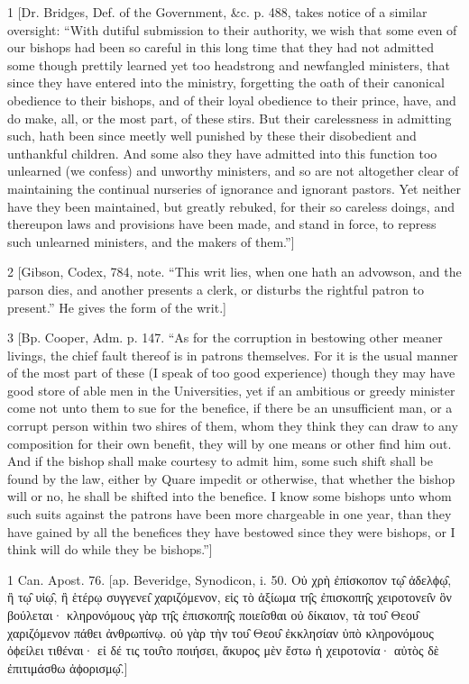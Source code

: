 1
[Dr. Bridges, Def. of the Government, &c. p. 488, takes notice of a similar oversight: “With dutiful submission to their authority, we wish that some even of our bishops had been so careful in this long time that they had not admitted some though prettily learned yet too headstrong and newfangled ministers, that since they have entered into the ministry, forgetting the oath of their canonical obedience to their bishops, and of their loyal obedience to their prince, have, and do make, all, or the most part, of these stirs. But their carelessness in admitting such, hath been since meetly well punished by these their disobedient and unthankful children. And some also they have admitted into this function too unlearned (we confess) and unworthy ministers, and so are not altogether clear of maintaining the continual nurseries of ignorance and ignorant pastors. Yet neither have they been maintained, but greatly rebuked, for their so careless doings, and thereupon laws and provisions have been made, and stand in force, to repress such unlearned ministers, and the makers of them.”]

2
[Gibson, Codex, 784, note. “This writ lies, when one hath an advowson, and the parson dies, and another presents a clerk, or disturbs the rightful patron to present.” He gives the form of the writ.]

3
[Bp. Cooper, Adm. p. 147. “As for the corruption in bestowing other meaner livings, the chief fault thereof is in patrons themselves. For it is the usual manner of the most part of these (I speak of too good experience) though they may have good store of able men in the Universities, yet if an ambitious or greedy minister come not unto them to sue for the benefice, if there be an unsufficient man, or a corrupt person within two shires of them, whom they think they can draw to any composition for their own benefit, they will by one means or other find him out. And if the bishop shall make courtesy to admit him, some such shift shall be found by the law, either by Quare impedit or otherwise, that whether the bishop will or no, he shall be shifted into the benefice. I know some bishops unto whom such suits against the patrons have been more chargeable in one year, than they have gained by all the benefices they have bestowed since they were bishops, or I think will do while they be bishops.”]

1
Can. Apost. 76. [ap. Beveridge, Synodicon, i. 50. Οὐ χρὴ ἐπίσκοπον τῳ̑ ἀδελϕῳ̑, ἢ τῳ̑ υἱῳ̑, ἢ ἑτέρῳ συγγενει̑ χαριζόμενον, εἰς τὸ ἀξίωμα τη̑ς ἐπισκοπη̑ς χειροτονει̑ν ὃν βούλεται· κληρονόμους γὰρ τη̑ς ἐπισκοπη̑ς ποιει̑σθαι οὐ δίκαιον, τὰ του̑ Θεου̑ χαριζόμενον πάθει ἀνθρωπίνῳ. οὐ γὰρ τὴν του̑ Θεου̑ ἐκκλησίαν ὑπὸ κληρονόμους ὀϕείλει τιθέναι· εἰ δέ τις του̑το ποιήσει, ἄκυρος μὲν ἔστω ἡ χειροτονία· αὐτὸς δὲ ἐπιτιμάσθω ἀϕορισμῳ̑.]

